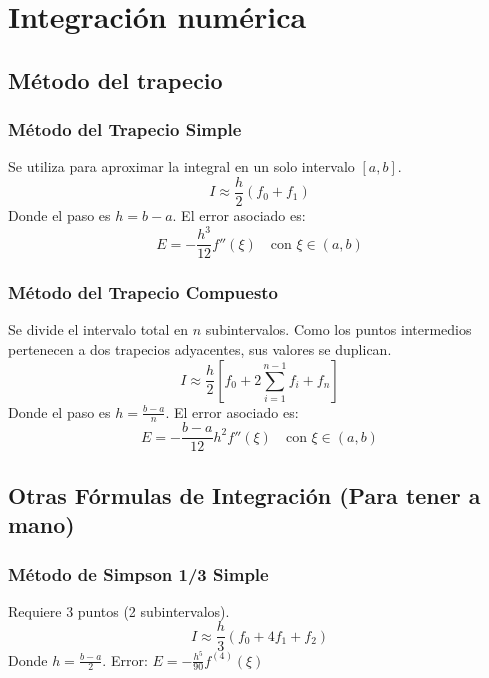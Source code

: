 \section{Integración numérica}
\subsection{Método del trapecio}
\subsubsection{Método del Trapecio Simple}
Se utiliza para aproximar la integral en un solo intervalo $[a, b]$.
\begin{equation}
    I \approx \frac{h}{2} (f_0 + f_1)
\end{equation}
Donde el paso es $h = b - a$.
El error asociado es:
\begin{equation}
    E = -\frac{h^3}{12} f''(\xi) \quad \text{con } \xi \in (a, b)
\end{equation}

\subsubsection{Método del Trapecio Compuesto}
Se divide el intervalo total en $n$ subintervalos. Como los puntos intermedios pertenecen a dos trapecios adyacentes, sus valores se duplican.
\begin{equation}
    I \approx \frac{h}{2} \left[ f_0 + 2 \sum_{i=1}^{n-1} f_i + f_n \right]
\end{equation}
Donde el paso es $h = \frac{b - a}{n}$.
El error asociado es:
\begin{equation}
    E = -\frac{b - a}{12} h^2 f''(\xi) \quad \text{con } \xi \in (a, b)
\end{equation}

\subsection{Otras Fórmulas de Integración (Para tener a mano)}

\subsubsection{Método de Simpson 1/3 Simple}
Requiere 3 puntos (2 subintervalos).
\begin{equation}
    I \approx \frac{h}{3} (f_0 + 4f_1 + f_2)
\end{equation}
Donde $h = \frac{b - a}{2}$.
Error: $E = -\frac{h^5}{90} f^{(4)}(\xi)$

